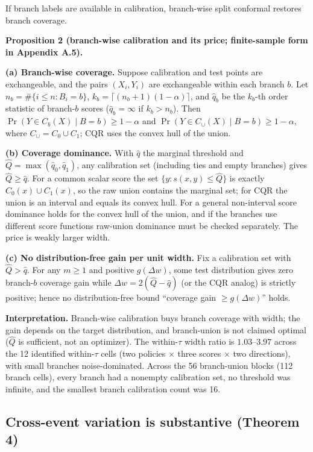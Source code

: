 If branch labels are available in calibration, branch-wise split conformal restores branch coverage.

\textbf{Proposition 2 (branch-wise calibration and its price; finite-sample form in Appendix A.5).}

\textbf{(a) Branch-wise coverage.} Suppose calibration and test points are exchangeable, and the pairs $(X_i,Y_i)$ are exchangeable within each branch $b$. Let $n_b=\#\{i\le n:B_i=b\}$, $k_b=\lceil(n_b+1)(1-\alpha)\rceil$, and $\hat q_b$ be the $k_b$-th order statistic of branch-$b$ scores ($\hat q_b=\infty$ if $k_b>n_b$). Then $\Pr(Y\in C_b(X)\mid B=b)\ge1-\alpha$ and $\Pr(Y\in C_\cup(X)\mid B=b)\ge1-\alpha$, where $C_\cup=C_0\cup C_1$; CQR uses the convex hull of the union.

\textbf{(b) Coverage dominance.} With $\hat q$ the marginal threshold and $\hat Q=\max(\hat q_0,\hat q_1)$, any calibration set (including ties and empty branches) gives $\hat Q\ge\hat q$. For a common scalar score the set $\{y:s(x,y)\le\hat Q\}$ is exactly $C_0(x)\cup C_1(x)$, so the raw union contains the marginal set; for CQR the union is an interval and equals its convex hull. For a general non-interval score dominance holds for the convex hull of the union, and if the branches use different score functions raw-union dominance must be checked separately. The price is weakly larger width.

\textbf{(c) No distribution-free gain per unit width.} Fix a calibration set with $\hat Q>\hat q$. For any $m\ge1$ and positive $g(\Delta w)$, some test distribution gives zero branch-$b$ coverage gain while $\Delta w=2(\hat Q-\hat q)$ (or the CQR analog) is strictly positive; hence no distribution-free bound ``coverage gain $\ge g(\Delta w)$'' holds.

\textbf{Interpretation.} Branch-wise calibration buys branch coverage with width; the gain depends on the target distribution, and branch-union is not claimed optimal ($\hat Q$ is sufficient, not an optimizer). The within-$\tau$ width ratio is $1.03$--$3.97$ across the 12 identified within-$\tau$ cells (two policies $\times$ three scores $\times$ two directions), with small branches noise-dominated. Across the 56 branch-union blocks (112 branch cells), every branch had a nonempty calibration set, no threshold was infinite, and the smallest branch calibration count was 16.

\subsection{Cross-event variation is substantive (Theorem 4)}

